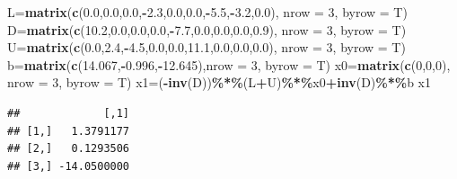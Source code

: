 \documentclass[
]{article}
\newenvironment{Shaded}{\begin{snugshade}}{\end{snugshade}}
\newcommand{\AttributeTok}[1]{\textcolor[rgb]{0.13,0.29,0.53}{#1}}
\newcommand{\DecValTok}[1]{\textcolor[rgb]{0.00,0.00,0.81}{#1}}
\newcommand{\FloatTok}[1]{\textcolor[rgb]{0.00,0.00,0.81}{#1}}
\newcommand{\FunctionTok}[1]{\textcolor[rgb]{0.13,0.29,0.53}{\textbf{#1}}}
\newcommand{\NormalTok}[1]{#1}
\newcommand{\OtherTok}[1]{\textcolor[rgb]{0.56,0.35,0.01}{#1}}
\newcommand{\SpecialCharTok}[1]{\textcolor[rgb]{0.81,0.36,0.00}{\textbf{#1}}}
\begin{document}
\begin{Shaded}
\begin{Highlighting}[]
\NormalTok{  L}\OtherTok{=}\FunctionTok{matrix}\NormalTok{(}\FunctionTok{c}\NormalTok{(}\FloatTok{0.0}\NormalTok{,}\FloatTok{0.0}\NormalTok{,}\FloatTok{0.0}\NormalTok{,}\SpecialCharTok{{-}}\FloatTok{2.3}\NormalTok{,}\FloatTok{0.0}\NormalTok{,}\FloatTok{0.0}\NormalTok{,}\SpecialCharTok{{-}}\FloatTok{5.5}\NormalTok{,}\SpecialCharTok{{-}}\FloatTok{3.2}\NormalTok{,}\FloatTok{0.0}\NormalTok{), }\AttributeTok{nrow =} \DecValTok{3}\NormalTok{, }\AttributeTok{byrow =}\NormalTok{ T)}
\NormalTok{  D}\OtherTok{=}\FunctionTok{matrix}\NormalTok{(}\FunctionTok{c}\NormalTok{(}\FloatTok{10.2}\NormalTok{,}\FloatTok{0.0}\NormalTok{,}\FloatTok{0.0}\NormalTok{,}\FloatTok{0.0}\NormalTok{,}\SpecialCharTok{{-}}\FloatTok{7.7}\NormalTok{,}\FloatTok{0.0}\NormalTok{,}\FloatTok{0.0}\NormalTok{,}\FloatTok{0.0}\NormalTok{,}\FloatTok{0.9}\NormalTok{), }\AttributeTok{nrow =} \DecValTok{3}\NormalTok{, }\AttributeTok{byrow =}\NormalTok{ T)}
\NormalTok{  U}\OtherTok{=}\FunctionTok{matrix}\NormalTok{(}\FunctionTok{c}\NormalTok{(}\FloatTok{0.0}\NormalTok{,}\FloatTok{2.4}\NormalTok{,}\SpecialCharTok{{-}}\FloatTok{4.5}\NormalTok{,}\FloatTok{0.0}\NormalTok{,}\FloatTok{0.0}\NormalTok{,}\FloatTok{11.1}\NormalTok{,}\FloatTok{0.0}\NormalTok{,}\FloatTok{0.0}\NormalTok{,}\FloatTok{0.0}\NormalTok{), }\AttributeTok{nrow =} \DecValTok{3}\NormalTok{, }\AttributeTok{byrow =}\NormalTok{ T)}
\NormalTok{  b}\OtherTok{=}\FunctionTok{matrix}\NormalTok{(}\FunctionTok{c}\NormalTok{(}\FloatTok{14.067}\NormalTok{,}\SpecialCharTok{{-}}\FloatTok{0.996}\NormalTok{,}\SpecialCharTok{{-}}\FloatTok{12.645}\NormalTok{),}\AttributeTok{nrow =} \DecValTok{3}\NormalTok{, }\AttributeTok{byrow =}\NormalTok{ T)}
\NormalTok{  x0}\OtherTok{=}\FunctionTok{matrix}\NormalTok{(}\FunctionTok{c}\NormalTok{(}\DecValTok{0}\NormalTok{,}\DecValTok{0}\NormalTok{,}\DecValTok{0}\NormalTok{), }\AttributeTok{nrow =} \DecValTok{3}\NormalTok{, }\AttributeTok{byrow =}\NormalTok{ T)}
\NormalTok{  x1}\OtherTok{=}\NormalTok{(}\SpecialCharTok{{-}}\FunctionTok{inv}\NormalTok{(D))}\SpecialCharTok{\%*\%}\NormalTok{(L}\SpecialCharTok{+}\NormalTok{U)}\SpecialCharTok{\%*\%}\NormalTok{x0}\SpecialCharTok{+}\FunctionTok{inv}\NormalTok{(D)}\SpecialCharTok{\%*\%}\NormalTok{b}
\NormalTok{  x1}
\end{Highlighting}
\end{Shaded}

\begin{verbatim}
##             [,1]
## [1,]   1.3791177
## [2,]   0.1293506
## [3,] -14.0500000
\end{verbatim}
\end{document}
